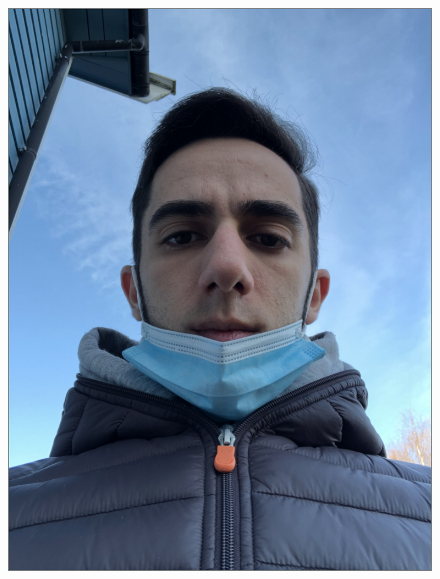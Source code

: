 \begin{figure}[h]
        {\includegraphics[scale = 0.18]{figures/1110.png}\hspace{0.42cm}}
    \subfloat

\end{figure}
